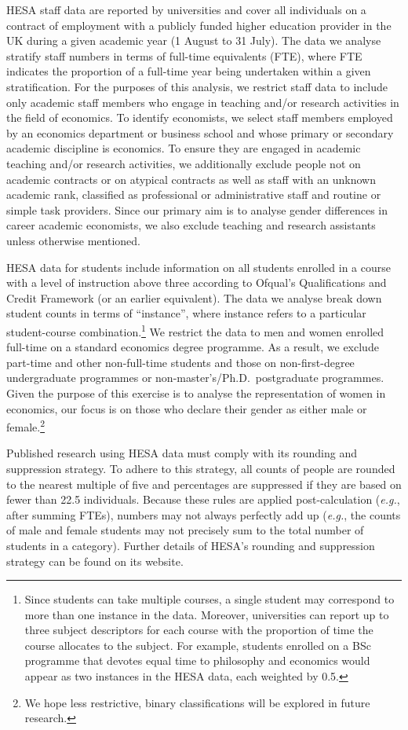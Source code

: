 \documentclass[a4paper, 1]{article}
\begin{document}
HESA staff data are reported by universities and cover all individuals on a contract of employment with a publicly funded higher education provider in the UK during a given academic year (1 August to 31 July). The data we analyse stratify staff numbers in terms of full-time equivalents (FTE), where FTE indicates the proportion of a full-time year being undertaken within a given stratification. For the purposes of this analysis, we restrict staff data to include only academic staff members who engage in teaching and/or research activities in the field of economics. To identify economists, we select staff members employed by an economics department or business school and whose primary or secondary academic discipline is economics. To ensure they are engaged in academic teaching and/or research activities, we additionally exclude people not on academic contracts or on atypical contracts as well as staff with an unknown academic rank, classified as professional or administrative staff and routine or simple task providers. Since our primary aim is to analyse gender differences in career academic economists, we also exclude teaching and research assistants unless otherwise mentioned.

HESA data for students include information on all students enrolled in a course with a level of instruction above three according to Ofqual's Qualifications and Credit Framework (or an earlier equivalent). The data we analyse break down student counts in terms of ``instance'', where instance refers to a particular student-course combination.\footnote{Since students can take multiple courses, a single student may correspond to more than one instance in the data. Moreover, universities can report up to three subject descriptors for each course with the proportion of time the course allocates to the subject. For example, students enrolled on a BSc programme that devotes equal time to philosophy and economics would appear as two instances in the HESA data, each weighted by 0.5.} We restrict the data to men and women enrolled full-time on a standard economics degree programme. As a result, we exclude part-time and other non-full-time students and those on non-first-degree undergraduate programmes or non-master's/Ph.D.~postgraduate programmes. Given the purpose of this exercise is to analyse the representation of women in economics, our focus is on those who declare their gender as either male or female.\footnote{We hope less restrictive, binary classifications will be explored in future research.}

Published research using HESA data must comply with its rounding and suppression strategy. To adhere to this strategy, all counts of people are rounded to the nearest multiple of five and percentages are suppressed if they are based on fewer than 22.5 individuals. Because these rules are applied post-calculation (\emph{e.g.}, after summing FTEs), numbers may not always perfectly add up (\emph{e.g.}, the counts of male and female students may not precisely sum to the total number of students in a category). Further details of HESA's rounding and suppression strategy can be found on its website.
\end{document}

